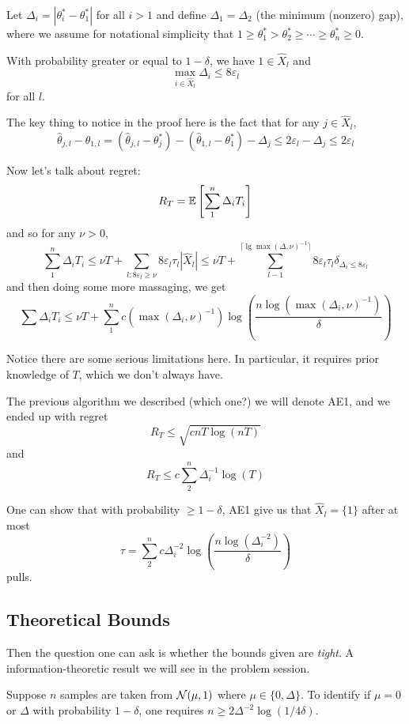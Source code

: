 \documentclass[12pt]{article}
\begin{document}
\begin{defn}
	Let $\Delta_i=|\theta_i^\ast-\theta_1^\ast|$ for all $i>1$ and define $\Delta_1=\Delta_2$ (the minimum (nonzero) gap), where we assume for notational simplicity that $1\ge\theta_1^\ast>\theta_2^\ast\ge\cdots\ge\theta_n^\ast\ge 0$.
\end{defn}
\begin{lem}
	With probability greater or equal to $1-\delta$, we have $1\in\hat X_l$ and 
	\[\max_{i\in\hat X_l}\Delta_i\le 8\varepsilon_l\]
	for all $l$.
\end{lem}
\begin{rmk}
	The key thing to notice in the proof here is the fact that for any $j\in\hat X_l$,
	\[\hat\theta_{j,l}-\hat\theta_{1,l}=(\hat\theta_{j,l}-\theta_j^\ast)-(\hat\theta_{1,l}-\theta_1^\ast)-\Delta_j\le 2\varepsilon_l-\Delta_j\le 2\varepsilon_l\]
\end{rmk}

Now let's talk about regret:
\[R_T=\mathbb{E}\left[\sum_1^n\Delta_i T_i\right]\]
and so for any $\nu>0$,
\[\sum_1^n\Delta_iT_i\le \nu T+\sum_{l:8\varepsilon_l\ge \nu}8\varepsilon_l\tau_l|\hat X_l|\le \nu T+\sum_{l-1}^{\lceil\lg\max(\Delta,\nu)^{-1}\rceil}8\varepsilon_l\tau_l\delta_{\Delta_i\le 8\varepsilon_l}\]
and then doing some more massaging, we get 
\[\sum\Delta_iT_i\le \nu T+\sum_1^n c(\max(\Delta_i,\nu)^{-1})\log\left(\frac{n\log(\max(\Delta_i,\nu)^{-1})}{\delta}\right)\]

\begin{rmk}
	Notice there are some serious limitations here. In particular, it requires prior knowledge of $T$, which we don't always have.
\end{rmk}

The previous algorithm we described (which one?) we will denote AE1, and we ended up with regret 
\[R_T\le\sqrt{cnT\log(nT)}\]
and 
\[R_T\le c\sum_2^n\Delta_i^{-1}\log(T)\]

One can show that with probability $\ge 1-\delta$, AE1 give us that $\hat X_l=\{1\}$ after at most 
\[\tau=\sum_2^n c\Delta_i^{-2}\log\left(\frac{n\log(\Delta_i^{-2})}{\delta}\right)\]
pulls.

\subsection{Theoretical Bounds}
Then the question one can ask is whether the bounds given are \textit{tight}. A information-theoretic result we will see in the problem session.
\begin{prop}
	Suppose $n$ samples are taken from $\mathcal{N}(\mu,1)$ where $\mu\in\{0,\Delta\}$. To identify if $\mu=0$ or $\Delta$ with probability $1-\delta$,
	one requires $n\ge 2\Delta^{-2}\log(1/4\delta).$
\end{prop}
\end{document}
